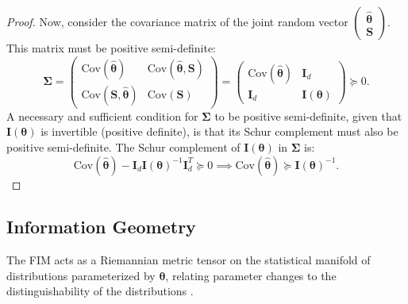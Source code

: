 \documentclass{article}
\theoremstyle{definition}
\begin{document}
\begin{proof}
Now, consider the covariance matrix of the joint random vector $\begin{pmatrix} \hat{\boldsymbol{\theta}} \\ \mathbf{S} \end{pmatrix}$. This matrix must be positive semi-definite:
\begin{equation}
    \boldsymbol{\Sigma} = \begin{pmatrix} \text{Cov}(\hat{\boldsymbol{\theta}}) & \text{Cov}(\hat{\boldsymbol{\theta}}, \mathbf{S}) \\ \text{Cov}(\mathbf{S}, \hat{\boldsymbol{\theta}}) & \text{Cov}(\mathbf{S}) \end{pmatrix} = \begin{pmatrix} \text{Cov}(\hat{\boldsymbol{\theta}}) & \mathbf{I}_d \\ \mathbf{I}_d & \mathbf{I}(\boldsymbol{\theta}) \end{pmatrix} \succeq 0.
\end{equation}
A necessary and sufficient condition for $\boldsymbol{\Sigma}$ to be positive semi-definite, given that $\mathbf{I}(\boldsymbol{\theta})$ is invertible (positive definite), is that its Schur complement must also be positive semi-definite. The Schur complement of $\mathbf{I}(\boldsymbol{\theta})$ in $\boldsymbol{\Sigma}$ is:
\begin{equation}
    \text{Cov}(\hat{\boldsymbol{\theta}}) - \mathbf{I}_d \mathbf{I}(\boldsymbol{\theta})^{-1} \mathbf{I}_d^T \succeq 0 \implies \text{Cov}(\hat{\boldsymbol{\theta}}) \succeq \mathbf{I}(\boldsymbol{\theta})^{-1}.
\end{equation}
\end{proof}

\subsection{Information Geometry}
The FIM acts as a Riemannian metric tensor on the statistical manifold of distributions parameterized by $\boldsymbol{\theta}$, relating parameter changes to the distinguishability of the distributions \cite{amari2016information}.
\end{document}
